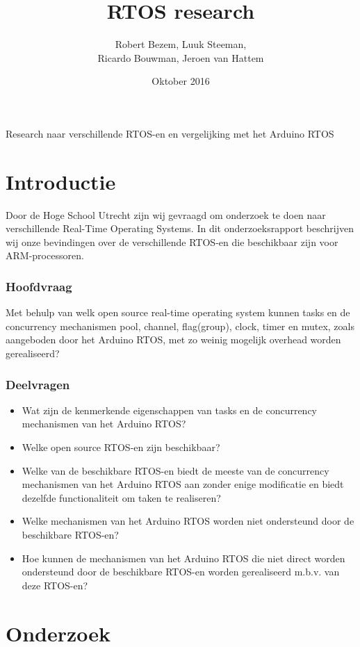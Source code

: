\documentclass{article}
\title{RTOS research}
\author{Robert Bezem, Luuk Steeman, \\
Ricardo Bouwman, Jeroen van Hattem}
\date{Oktober 2016}
\begin{document}
\begin{titlepage}
\maketitle
Research naar verschillende RTOS-en en vergelijking met het Arduino RTOS
\end{titlepage}

\setcounter{page}{2}
\tableofcontents
\newpage

\part{Introductie}
Door de Hoge School Utrecht zijn wij gevraagd om onderzoek te doen naar verschillende Real-Time Operating Systems. In dit onderzoeksrapport beschrijven wij onze bevindingen over de verschillende RTOS-en die beschikbaar zijn voor ARM-processoren. 
\section{Hoofdvraag}
Met behulp van welk open source real-time operating system kunnen tasks en de concurrency mechanismen pool, channel, flag(group), clock, timer en mutex, zoals aangeboden door het Arduino RTOS, met zo weinig mogelijk overhead worden gerealiseerd?
\section{Deelvragen}
\begin{itemize}
\item Wat zijn de kenmerkende eigenschappen van tasks en de concurrency mechanismen van het Arduino RTOS?
\item Welke open source RTOS-en zijn beschikbaar?
\item Welke van de beschikbare RTOS-en biedt de meeste van de concurrency mechanismen van het Arduino RTOS aan zonder enige modificatie en biedt dezelfde functionaliteit om taken te realiseren?
\item Welke mechanismen van het Arduino RTOS worden niet ondersteund door de beschikbare RTOS-en?
\item Hoe kunnen de mechanismen van het Arduino RTOS die niet direct worden ondersteund door de beschikbare RTOS-en worden gerealiseerd m.b.v. van deze RTOS-en?
\end{itemize}

\newpage

\part{Onderzoek}
\end{document}

